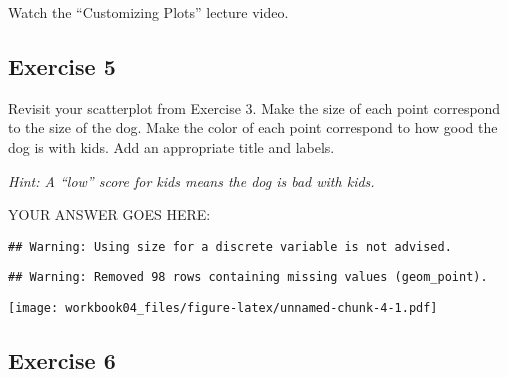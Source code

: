 \documentclass[
]{article}
\newenvironment{Shaded}{\begin{snugshade}}{\end{snugshade}}
\newcommand{\DataTypeTok}[1]{\textcolor[rgb]{0.13,0.29,0.53}{#1}}
\newcommand{\KeywordTok}[1]{\textcolor[rgb]{0.13,0.29,0.53}{\textbf{#1}}}
\newcommand{\NormalTok}[1]{#1}
\newcommand{\OperatorTok}[1]{\textcolor[rgb]{0.81,0.36,0.00}{\textbf{#1}}}
\newcommand{\StringTok}[1]{\textcolor[rgb]{0.31,0.60,0.02}{#1}}
\begin{document}
Watch the ``Customizing Plots'' lecture video.

\hypertarget{exercise-5}{%
\subsection{Exercise 5}\label{exercise-5}}

Revisit your scatterplot from Exercise 3. Make the size of each point
correspond to the size of the dog. Make the color of each point
correspond to how good the dog is with kids. Add an appropriate title
and labels.

\emph{Hint: A ``low'' score for kids means the dog is bad with kids.}

YOUR ANSWER GOES HERE:

\begin{Shaded}
\end{Shaded}

\begin{verbatim}
## Warning: Using size for a discrete variable is not advised.
\end{verbatim}

\begin{verbatim}
## Warning: Removed 98 rows containing missing values (geom_point).
\end{verbatim}

\texttt{[image: workbook04\_files/figure-latex/unnamed-chunk-4-1.pdf]}

\hypertarget{exercise-6}{%
\subsection{Exercise 6}\label{exercise-6}}
\end{document}
